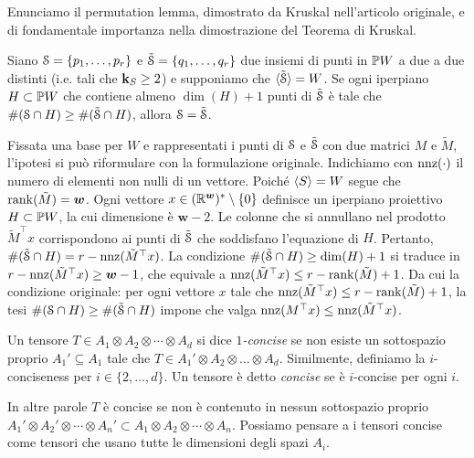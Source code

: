 Enunciamo il permutation lemma, dimostrato da Kruskal nell'articolo originale, e di fondamentale
importanza nella dimostrazione del Teorema di Kruskal.
\begin{lemma}
	\label{lemma:perm}
	Siano $ \mathcal{S} = \{p_1, \ldots, p_r\}  $ e $ \tilde{\mathcal{S}} = \{q_1, \ldots, q_r\} $ due insiemi di punti
	in $ \mathbb{P} W $ a due a due distinti (i.e. tali che $ \mathbf{k}_{S} \ge 2 $) e supponiamo che $
		\angb{\tilde{\s}} = W $. Se ogni iperpiano $ H \subset \mathbb{P} W $ che contiene almeno $ \dim(H) + 1 $ punti di $ \tilde{\mathcal{S}} $ è tale che $ \#(\mathcal{S} \cap H) \ge
		\#(\tilde{\mathcal{S}} \cap H) $, allora $ \mathcal{S} = \tilde{\mathcal{S}} $.
\end{lemma}
\begin{remark}
	Fissata una base per $ W $ e rappresentati i punti di $ \mathcal{S} $ e $ \tilde{\mathcal{S}} $ con due matrici $ M $
	e $ \tilde{M} $, l'ipotesi si può riformulare con la formulazione originale. Indichiamo con $
		\operatorname{nnz}(\cdot ) $ il numero di elementi non nulli di un vettore.
	Poiché $ \angb{S} = W $ segue che $ \operatorname{rank}(\tilde{M}) = \bm{w}$.
	Ogni vettore $ x \in (\mathbb{R}^{\bm{w}})^* \setminus \{0\}  $ definisce un iperpiano proiettivo $ H
		\subset \mathbb{P} W $, la cui dimensione è $ \bm{w} - 2 $. Le colonne che si annullano nel prodotto $
		\tilde{M}^{\top}x $ corrispondono ai punti di $ \tilde{\mathcal{S}} $ che soddisfano l'equazione di $ H
	$. Pertanto, $ \#(\tilde{\mathcal{S}} \cap H)  = r - \operatorname{nnz}(\tilde{M}^{\top}x)$.
	La condizione $ \#(\tilde{\mathcal{S}} \cap H) \ge \dim(H) + 1 $ si traduce in $ r -
		\operatorname{nnz}(\tilde{M}^{\top}x) \ge \bm{w}-1 $, che equivale a $ \operatorname{nnz}(\tilde{M}^{\top}x) \le r -
		\operatorname{rank}(\tilde{M}) + 1 $. Da cui la condizione originale: per ogni vettore $ x $ tale che $
		\operatorname{nnz}(\tilde{M}^{\top}x) \le r - \operatorname{rank}(\tilde{M}) +1 $, la tesi $ \#(\mathcal{S} \cap H) \ge \#(\tilde{\mathcal{S}}
		\cap H) $ impone che valga $ \operatorname{nnz}(M^{\top}x) \le \operatorname{nnz}(\tilde{M}^{\top}x) $.
\end{remark}


\begin{definition}
	\label{def:concise_tensor}
	Un tensore $ T \in A_1 \otimes A_2 \otimes \cdots \otimes A_d $ si dice \emph{$ 1 $-concise} se non esiste un
	sottospazio proprio $ A_1' \subseteq A_1$ tale che $ T \in A_1' \otimes A_2 \otimes \ldots \otimes A_d $.
	Similmente, definiamo la $ i $-conciseness per $ i \in \{2, \ldots, d\}  $. Un tensore è detto
	\emph{concise} se è $ i $-concise per ogni $ i $.
\end{definition}
\begin{remark}
	In altre parole $ T $ è concise se non è contenuto in nessun sottospazio proprio $ A_1' \otimes
		A_2' \otimes \cdots \otimes A_n' \subset A_1 \otimes A_2 \otimes \cdots \otimes A_n $.
	Possiamo pensare a i tensori concise come tensori che usano tutte le dimensioni degli spazi
	$ A_i $.
\end{remark}

